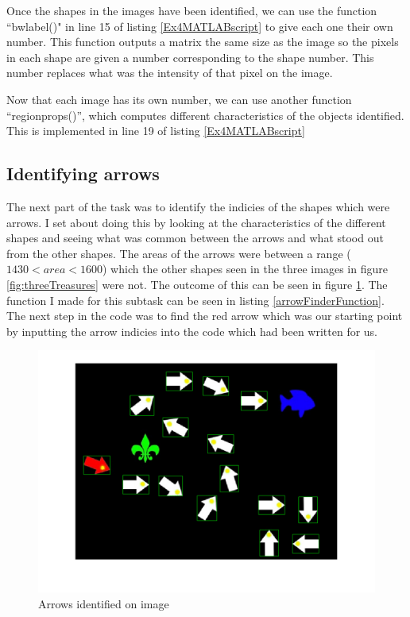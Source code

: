 \documentclass[11pt, letterpaper]{article}
\begin{document}
Once the shapes in the images have been identified, we can use the function ``bwlabel()" in line 15 of listing \ref{Ex4MATLABscript} to give each one their own number. This function outputs a matrix the same size as the image so the pixels in each shape are given a number corresponding to the shape number. This number replaces what was the intensity of that pixel on the image.

Now that each image has its own number, we can use another function ``regionprops()'', which computes different characteristics of the objects identified. This is implemented in line 19 of listing \ref{Ex4MATLABscript}

\subsection{Identifying arrows}
The next part of the task was to identify the indicies of the shapes which were arrows. I set about doing this by looking at the characteristics of the different shapes and seeing what was common between the arrows and what stood out from the other shapes. The areas of the arrows were between a range (\begin{math}1430<area<1600\end{math}) which the other shapes seen in the three images in figure \ref{fig:threeTreasures} were not. The outcome of this can be seen in figure \ref{fig:arrowFinder}. The function I made for this subtask can be seen in listing \ref{arrowFinderFunction}. The next step in the code was to find the red arrow which was our starting point by inputting the arrow indicies into the code which had been written for us.

\begin{figure}[ht]
    \centering
    \includegraphics[width=0.75\linewidth]{Lab 4/arrowFinder.png}
    \caption{Arrows identified on image}
    \label{fig:arrowFinder}
\end{figure}
\end{document}
